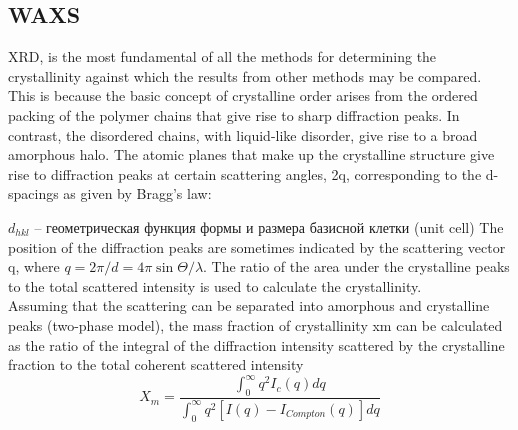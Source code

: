 \subsection{WAXS}
XRD, is the most fundamental of all
the methods for determining the crystallinity against which the results from
other methods may be compared.\\
This is because the basic concept of crystalline
order arises from the ordered packing of the polymer chains that give rise to sharp
diffraction peaks. In contrast, the disordered chains, with liquid-like disorder, give
rise to a broad amorphous halo. The atomic planes that make up the crystalline
structure give rise to diffraction peaks at certain scattering angles, 2q, corresponding
to the d-spacings as given by Bragg’s law:

$d_{hkl}$ -- геометрическая функция формы и размера базисной клетки (unit cell)
The position of the diffraction peaks are sometimes indicated by the scattering vector q, where $q = 2\pi/d = 4\pi \sin \Theta / \lambda$. The ratio of the area under the crystalline peaks
to the total scattered intensity is used to calculate the crystallinity.\\
Assuming that the scattering can be separated into amorphous and crystalline
peaks (two-phase model), the mass fraction of crystallinity xm can be calculated
as the ratio of the integral of the diffraction intensity scattered by the crystalline fraction
to the total coherent scattered intensity
\[
X_m = \frac{\int_0^{\infty} q^2 I_c(q) dq}{\int_0^{\infty} q^2 [I(q) - I_{Compton}(q)] dq}
\]

